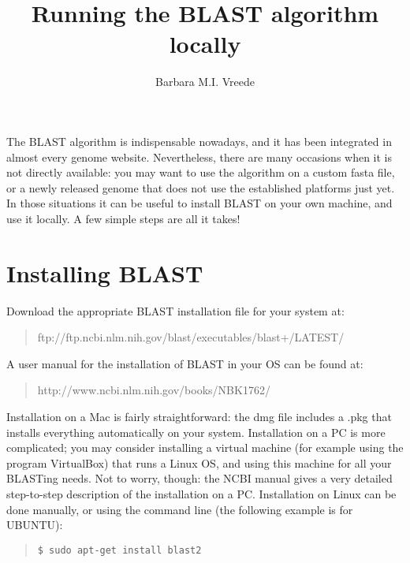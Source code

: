 \documentclass[12pt]{article}
\title{Running the BLAST algorithm locally}
\author{Barbara M.I. Vreede}
\begin{document}
\maketitle
The BLAST algorithm is indispensable nowadays, and it has been integrated in almost every genome website. Nevertheless, there are many occasions when it is not directly available: you may want to use the algorithm on a custom fasta file, or a newly released genome that does not use the established platforms just yet. In those situations it can be useful to install BLAST on your own machine, and use it locally. A few simple steps are all it takes!
\section{Installing BLAST}
Download the appropriate BLAST installation file for your system at:
\begin{quote}
{ftp://ftp.ncbi.nlm.nih.gov/blast/executables/blast+/LATEST/}
\end{quote}
A user manual for the installation of BLAST in your OS can be found at:
\begin{quote}{http://www.ncbi.nlm.nih.gov/books/NBK1762/}
\end{quote}
Installation on a Mac is fairly straightforward: the dmg file includes a .pkg that installs everything automatically on your system. Installation on a PC is more complicated; you may consider installing a virtual machine (for example using the program VirtualBox) that runs a Linux OS, and using this machine for all your BLASTing needs. Not to worry, though: the NCBI manual gives a very detailed step-to-step description of the installation on a PC. Installation on Linux can be done manually, or using the command line (the following example is for UBUNTU):
\begin{quote}
\begin{verbatim}
$ sudo apt-get install blast2
\end{verbatim}
\end{quote}
\end{document}
